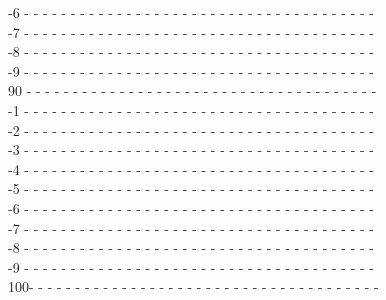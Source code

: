 {\begin{flushleft}
-6 - - - - - - - - - - - - - - - - - - - - - - - - - - - - - - - - - - - - - -\\
-7 - - - - - - - - - - - - - - - - - - - - - - - - - - - - - - - - - - - - - -\\
-8 - - - - - - - - - - - - - - - - - - - - - - - - - - - - - - - - - - - - - -\\
-9 - - - - - - - - - - - - - - - - - - - - - - - - - - - - - - - - - - - - - -\\
90 - - - - - - - - - - - - - - - - - - - - - - - - - - - - - - - - - - - - - -\\
-1 - - - - - - - - - - - - - - - - - - - - - - - - - - - - - - - - - - - - - -\\
-2 - - - - - - - - - - - - - - - - - - - - - - - - - - - - - - - - - - - - - -\\
-3 - - - - - - - - - - - - - - - - - - - - - - - - - - - - - - - - - - - - - -\\
-4 - - - - - - - - - - - - - - - - - - - - - - - - - - - - - - - - - - - - - -\\
-5 - - - - - - - - - - - - - - - - - - - - - - - - - - - - - - - - - - - - - -\\
-6 - - - - - - - - - - - - - - - - - - - - - - - - - - - - - - - - - - - - - -\\
-7 - - - - - - - - - - - - - - - - - - - - - - - - - - - - - - - - - - - - - -\\
-8 - - - - - - - - - - - - - - - - - - - - - - - - - - - - - - - - - - - - - -\\
-9 - - - - - - - - - - - - - - - - - - - - - - - - - - - - - - - - - - - - - -\\
100- - - - - - - - - - - - - - - - - - - - - - - - - - - - - - - - - - - - - -\\
\end{flushleft} }